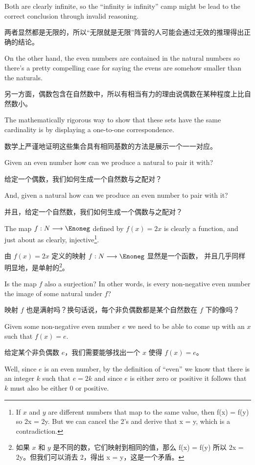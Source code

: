 Both are clearly infinite, so the ``infinity is infinity'' camp might be lead
to the correct conclusion through invalid reasoning.

两者显然都是无限的，所以“无限就是无限”阵营的人可能会通过无效的推理得出正确的结论。

On the other hand,
the even numbers are contained in the natural numbers so there's a pretty
compelling case for saying the evens are somehow smaller than the naturals.

另一方面，偶数包含在自然数中，所以有相当有力的理由说偶数在某种程度上比自然数小。

The mathematically rigorous way to show that these sets have the same
cardinality is by displaying a one-to-one correspondence.

数学上严谨地证明这些集合具有相同基数的方法是展示一个一一对应。

Given an even
number how can we produce a natural to pair it with?

给定一个偶数，我们如何生成一个自然数与之配对？

And, given a natural
how can we produce an even number to pair with it?

并且，给定一个自然数，我们如何生成一个偶数与之配对？

The map $f : N \longrightarrow \Enoneg$ defined by $f(x) = 2x$
is clearly a function,
and just about as clearly, injective\footnote{If $x$ and $y$ are
    different numbers that map to the same value, then f(x) = f(y) so
    2x = 2y.
    But we can cancel the 2's and derive that x = y, which is a contradiction.}.

由 $f(x) = 2x$ 定义的映射 $f : N \longrightarrow \Enoneg$ 显然是一个函数，
并且几乎同样明显地，是单射的\footnote{如果 $x$ 和 $y$ 是不同的数，它们映射到相同的值，那么 f(x) = f(y) 所以 2x = 2y。但我们可以消去 2，得出 x = y，这是一个矛盾。}。

Is the map $f$ also a surjection? In other
words, is every non-negative even number the image of some natural under
$f$?

映射 $f$ 也是满射吗？换句话说，每个非负偶数都是某个自然数在 $f$ 下的像吗？

Given some non-negative even number $e$ we need to be able to come
up with an $x$ such that $f(x) = e$.

给定某个非负偶数 $e$，我们需要能够找出一个 $x$ 使得 $f(x) = e$。

Well, since $e$ is an even number, by the
definition of ``even'' we know that there is an integer $k$ such that $e = 2k$
and since $e$ is either zero or positive it follows that $k$ must also be
either $0$ or positive.

